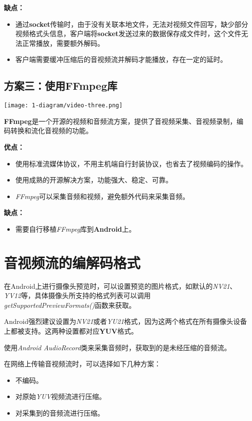 \documentclass[11pt,a4paper]{article}
\begin{document}
\begin{CJK}{UTF8}{gbsn}
    \textbf{缺点：}
    \begin{itemize}
        \item 通过\textbf{socket}传输时，由于没有关联本地文件，无法对视频文件回写，缺少部分视频格式头信息，客户端将\textbf{socket}发送过来的数据保存成文件时，这个文件无法正常播放，需要额外解码。
        \item 客户端需要缓冲压缩后的音视频流并解码才能播放，存在一定的延时。
    \end{itemize}

    \subsection{方案三：使用FFmpeg库}
    \texttt{[image: 1-diagram/video-three.png]}
    \par
    \textbf{FFmpeg}是一个开源的视频和音频流方案，提供了音视频采集、音视频录制，编码转换和流化音视频的功能。\par

    \textbf{优点：}
    \begin{itemize}
        \item 使用标准流媒体协议，不用主机端自行封装协议，也省去了视频编码的操作。
        \item 使用成熟的开源解决方案，功能强大、稳定、可靠。
        \item \emph{FFmpeg}可以采集音频和视频，避免额外代码来采集音频。
    \end{itemize}

    \textbf{缺点：}
    \begin{itemize}
        \item 需要自行移植\emph{FFmpeg}库到\textbf{Android}上。
    \end{itemize}

    \section{音视频流的编解码格式}
    在Android上进行摄像头预览时，可以设置预览的图片格式，如默认的\emph{NV21}、\emph{YV12}等，具体摄像头所支持的格式列表可以调用\\ \emph{getSupportedPreviewFormats()}函数来获取。\par
    Android强烈建议设置为\emph{NV21}或者\emph{YU21}格式，因为这两个格式在所有摄像头设备上都被支持。这两种设置都对应\textbf{YUV}格式。\par
    使用\emph{Android AudioRecord}类来采集音频时，获取到的是未经压缩的音频流。\par
    在网络上传输音视频流时，可以选择如下几种方案：
    \begin{itemize}
        \item 不编码。
        \item 对原始\emph{YUV}视频流进行压缩。
        \item 对采集到的音频流进行压缩。
    \end{itemize}


\end{CJK}
\end{document}
